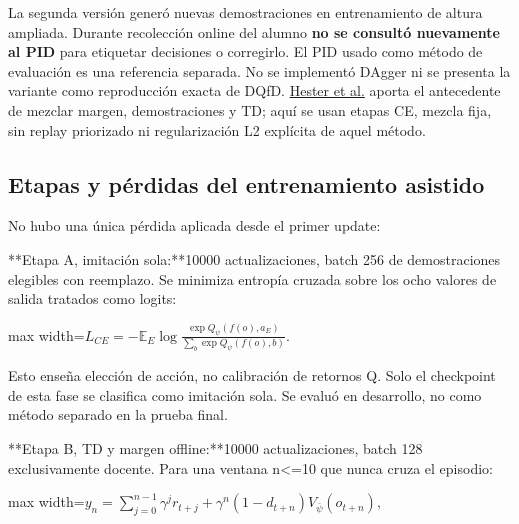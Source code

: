\documentclass[12pt,a4paper]{article}
\begin{document}
La segunda versión generó nuevas demostraciones en entrenamiento de altura ampliada. Durante recolección online del alumno \textbf{no se consultó nuevamente al PID} para etiquetar decisiones o corregirlo. El PID usado como método de evaluación es una referencia separada. No se implementó DAgger ni se presenta la variante como reproducción exacta de DQfD. \href{https://arxiv.org/html/1704.03732v4}{Hester et al.} aporta el antecedente de mezclar margen,\allowbreak{} demostraciones y TD; aquí se usan etapas CE,\allowbreak{} mezcla fija,\allowbreak{} sin replay priorizado ni regularización L2 explícita de aquel método.



\subsection{Etapas y pérdidas del entrenamiento asistido}
No hubo una única pérdida aplicada desde el primer update:


**Etapa A,\allowbreak{} imitación sola:**10000 actualizaciones,\allowbreak{} batch 256 de demostraciones elegibles con reemplazo. Se minimiza entropía cruzada sobre los ocho valores de salida tratados como logits:



\begin{center}\begin{adjustbox}{max width=\linewidth}$\displaystyle L_{CE}=-\mathbb E_E\log\frac{\exp Q_\psi(f(o),a_E)}{\sum_b\exp Q_\psi(f(o),b)}.$\end{adjustbox}\end{center}



Esto enseña elección de acción,\allowbreak{} no calibración de retornos Q. Solo el checkpoint de esta fase se clasifica como imitación sola. Se evaluó en desarrollo,\allowbreak{} no como método separado en la prueba final.


**Etapa B,\allowbreak{} TD y margen offline:**10000 actualizaciones,\allowbreak{} batch 128 exclusivamente docente. Para una ventana n<=10 que nunca cruza el episodio:



\begin{center}\begin{adjustbox}{max width=\linewidth}$\displaystyle y_n=\sum_{j=0}^{n-1}\gamma^j r_{t+j}+
\gamma^n(1-d_{t+n})V_{\bar\psi}(o_{t+n}),$\end{adjustbox}\end{center}
\end{document}
